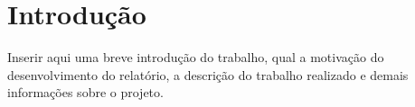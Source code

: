 \section{Introdução}

Inserir aqui uma breve introdução do trabalho, qual a motivação do desenvolvimento do relatório, a descrição do trabalho realizado e demais informações sobre o projeto.